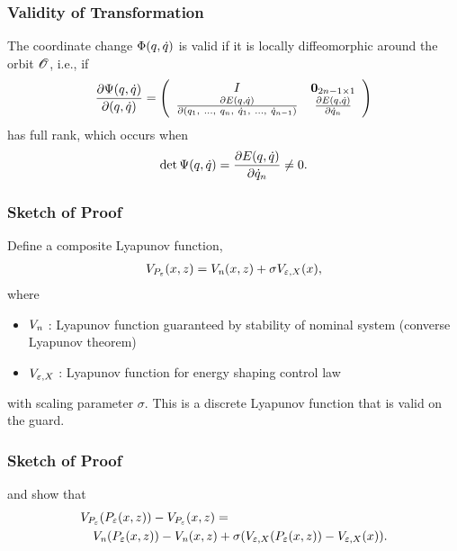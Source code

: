 \begin{frame}
  \frametitle{Validity of Transformation}
  The coordinate change $\Phi(q, \dot q)$ is valid if it is locally diffeomorphic around the orbit
  $\mathscr O$, i.e., if
  \begin{align}
    \frac{\partial{\Psi(\ensuremath{q}, \ensuremath{\dot q})}}{\partial{(\ensuremath{q}, \ensuremath{\dot q})}} =
    \left(\begin{array}{c c}
        I & {\mathbf 0}_{2n-1 \times 1}\\
        \frac{\partial{E(\ensuremath{q}, \ensuremath{\dot q})}}{\partial{(\ensuremath{q}_{1}, \ \ldots, \ q_{n}, \ \ensuremath{\dot q}_{1}, \ \ldots, \ \ensuremath{\dot q}_{n-1})}} & \frac{\partial{E(\ensuremath{q}, \ensuremath{\dot q})}}{\partial{\ensuremath{\dot q}_{n}}}
      \end{array}\right)
  \end{align}
  has full rank, which occurs when
  \begin{align*}
    \det \Psi(q, \dot q) = \frac{\partial{E(\ensuremath{q}, \ensuremath{\dot q})}}{\partial{\ensuremath{\dot q}_{n}}} \ne 0.
  \end{align*}
\end{frame}
  
\begin{frame}
  \frametitle{Sketch of Proof}
  Define a composite Lyapunov function,
  \begin{align*}
    V_{P_{\varepsilon}}(x, z) = V_{\mathit{n}}(x, z) + \sigma V_{\varepsilon, X}(x),
  \end{align*}
  where
  \begin{itemize}
  \item $V_{\mathit{n}}$ : Lyapunov function guaranteed by stability of nominal system
    (converse Lyapunov theorem)
  \item $V_{\varepsilon, X}$ : Lyapunov function for energy shaping control law
  \end{itemize}
  with scaling parameter $\sigma$. This is a discrete Lyapunov function that is
  valid on the guard.

\end{frame}

\begin{frame}
  \frametitle{Sketch of Proof}  
  and show that
  \begin{align*}
    \lefteqn{\VP(\Pe\argsxz) - \VP\argsxz =}\\
    &&\Vn(\Pe\argsxz) - \Vn\argsxz + \sigma(\Vex(\Pe\argsxz) - \Vex(\zdx)).
  \end{align*}
\end{frame}
